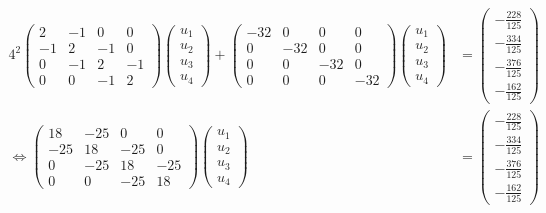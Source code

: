 \documentclass{exercise}
\begin{document}
\begin{itemize}
\begin{align*}
            4^2\begin{pmatrix}
                2 & -1 & 0 & 0\\
                -1 & 2 & -1 & 0\\
                0 & -1 & 2 & -1\\
                0 & 0 & -1 & 2
            \end{pmatrix}\begin{pmatrix}
                u_1\\u_2\\u_3\\u_4
            \end{pmatrix} + \begin{pmatrix}
                -32 & 0 & 0 & 0\\
                0 & -32 & 0 & 0\\
                0 & 0 & -32 & 0\\
                0 & 0 & 0 & -32
            \end{pmatrix}\begin{pmatrix}
                u_1\\u_2\\u_3\\u_4
            \end{pmatrix} &= \begin{pmatrix}
                -\frac{228}{125}\\-\frac{334}{125}\\-\frac{376}{125}\\-\frac{162}{125}
            \end{pmatrix}\\
            \iff \begin{pmatrix}
                18 & -25 & 0 & 0\\
                -25 & 18 & -25 & 0\\
                0 & -25 & 18 & -25\\
                0 & 0 & -25 & 18
            \end{pmatrix}\begin{pmatrix}
                u_1\\u_2\\u_3\\u_4
            \end{pmatrix} &= \begin{pmatrix}
                -\frac{228}{125}\\-\frac{334}{125}\\-\frac{376}{125}\\-\frac{162}{125}

\end{pmatrix}
\end{align*}
\end{itemize}
\end{document}
